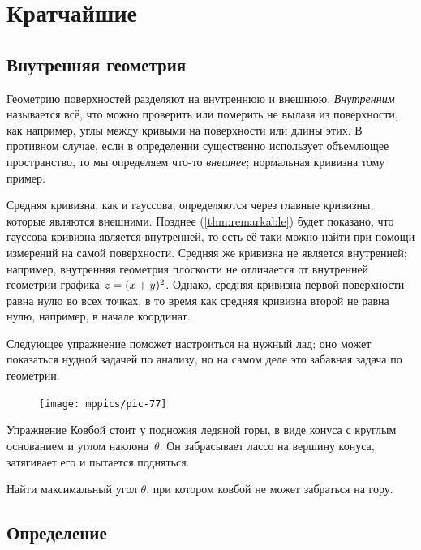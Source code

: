 \chapter{Кратчайшие}
\label{chap:shortest}

\section{Внутренняя геометрия}

Геометрию поверхностей разделяют на внутреннюю и внешнюю.
\emph{Внутренним} называется всё, что можно проверить или померить не вылазя из поверхности,
как например, углы между кривыми на поверхности или длины этих.
В противном случае, если в определении существенно использует объемлющее пространство, то мы определяем что-то \emph{внешнее};
нормальная кривизна тому пример.

Средняя кривизна, как и гауссова, определяются через главные кривизны, которые являются внешними.
Позднее (\ref{thm:remarkable}) будет показано, что гауссова кривизна является внутренней, то есть её таки можно найти при помощи измерений на самой поверхности.
Средняя же кривизна не является внутренней; например, внутренняя геометрия плоскости не отличается от внутренней геометрии графика $z\z=(x+y)^2$.
Однако, средняя кривизна первой поверхности равна нулю во всех точках, в то время как средняя кривизна второй не равна нулю, например, в начале координат.

Следующее упражнение поможет настроиться на нужный лад;
оно может показаться нудной задачей по анализу, но на самом деле это забавная задача по геометрии.

\begin{figure}
\vskip-0mm
\centering
\texttt{[image: mppics/pic-77]}
\vskip-0mm
\end{figure}

\begin{thm}{Упражнение}\label{ex:lasso}
Ковбой стоит у подножия ледяной горы, в виде конуса с круглым основанием и углом наклона~$\theta$.
Он забрасывает лассо на вершину конуса, затягивает его и пытается подняться.

Найти максимальный угол $\theta$, при котором ковбой не может забраться на гору.
\end{thm}


\section{Определение}

